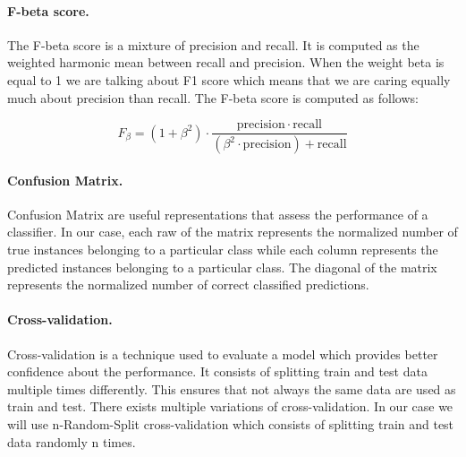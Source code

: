 \paragraph{F-beta score.} The F-beta score is a mixture of precision and recall. It is computed as the weighted harmonic mean between recall and precision. When the weight beta is equal to 1 we are talking about F1 score which means that we are caring equally much about precision than recall. The F-beta score is computed as follows:


$$ F_\beta = (1 + \beta^2) \cdot \frac{\mathrm{precision} \cdot \mathrm{recall}}{(\beta^2 \cdot \mathrm{precision}) + \mathrm{recall}}$$


\paragraph{Confusion Matrix.} Confusion Matrix are useful representations that assess the performance of a classifier. In our case, each raw of the matrix represents the normalized number of true instances belonging to a particular class while each column represents the predicted instances belonging to a particular class. The diagonal of the matrix represents the normalized number of correct classified predictions.




\paragraph{Cross-validation.}

Cross-validation is a technique used to evaluate a model which provides better confidence about the performance. It consists of splitting train and test data multiple times differently. This ensures that not always the same data are used as train and test. There exists multiple variations of cross-validation. In our case we will use n-Random-Split cross-validation which consists of splitting train and test data randomly n times.
